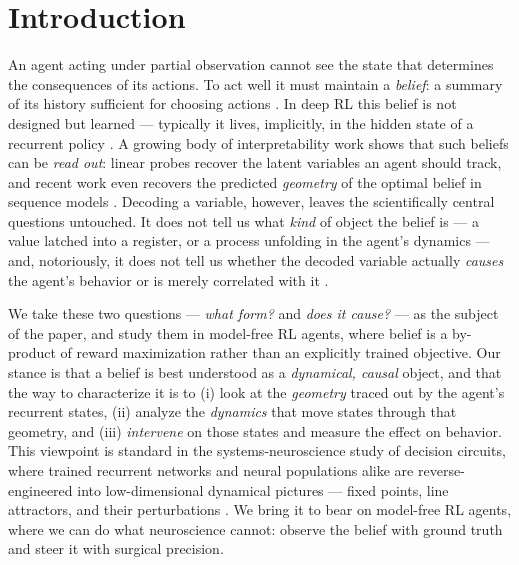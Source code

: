 \documentclass[11pt]{article}
\begin{document}
\section{Introduction}

An agent acting under partial observation cannot see the state that determines
the consequences of its actions. To act well it must maintain a \emph{belief}: a
summary of its history sufficient for choosing actions \citep{kaelbling1998planning}.
In deep RL this belief is not designed but learned --- typically it lives,
implicitly, in the hidden state of a recurrent policy \citep{lambrechts2022recurrent,
mikulik2020meta}. A growing body of interpretability work shows that such beliefs
can be \emph{read out}: linear probes recover the latent variables an agent should
track, and recent work even recovers the predicted \emph{geometry} of the optimal
belief in sequence models \citep{shai2024transformers, li2023othello}. Decoding a
variable, however, leaves the scientifically central questions untouched. It does
not tell us what \emph{kind} of object the belief is --- a value latched into a
register, or a process unfolding in the agent's dynamics --- and, notoriously, it
does not tell us whether the decoded variable actually \emph{causes} the agent's
behavior or is merely correlated with it \citep{ravichander2021probing}.

We take these two questions --- \emph{what form?} and \emph{does it cause?} --- as
the subject of the paper, and study them in model-free RL agents, where belief is
a by-product of reward maximization rather than an explicitly trained objective.
Our stance is that a belief is best understood as a \emph{dynamical, causal}
object, and that the way to characterize it is to (i) look at the \emph{geometry}
traced out by the agent's recurrent states, (ii) analyze the \emph{dynamics} that
move states through that geometry, and (iii) \emph{intervene} on those states and
measure the effect on behavior. This viewpoint is standard in the
systems-neuroscience study of decision circuits, where trained recurrent networks
and neural populations alike are reverse-engineered into low-dimensional dynamical
pictures --- fixed points, line attractors, and their perturbations
\citep{mante2013context, sussillo2013opening, wong2006recurrent}. We bring it to
bear on model-free RL agents, where we can do what neuroscience cannot: observe
the belief with ground truth and steer it with surgical precision.
\end{document}
